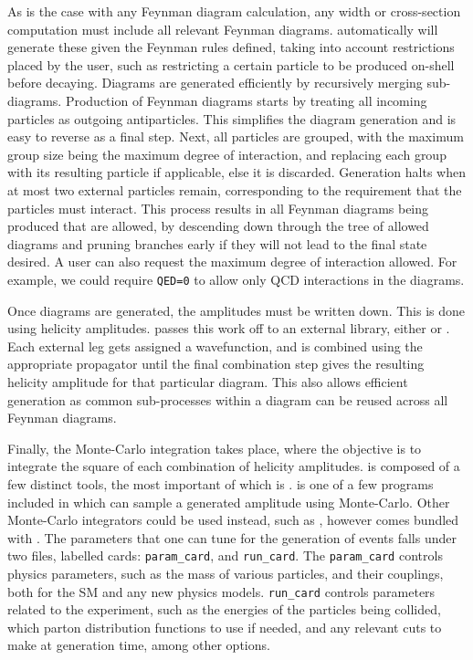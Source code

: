 As is the case with any Feynman diagram calculation, any width or cross-section computation must include all relevant Feynman diagrams.
\madgraph automatically will generate these given the Feynman rules defined, taking into account restrictions placed by the user, such as restricting a certain particle to be produced on-shell before decaying.
Diagrams are generated efficiently by recursively merging sub-diagrams.
Production of Feynman diagrams starts by treating all incoming particles as outgoing antiparticles.
This simplifies the diagram generation and is easy to reverse as a final step.
Next, all particles are grouped, with the maximum group size being the maximum degree of interaction, and replacing each group with its resulting particle if applicable, else it is discarded.
Generation halts when at most two external particles remain, corresponding to the requirement that the particles must interact.
This process results in all Feynman diagrams being produced that are allowed, by descending down through the tree of allowed diagrams and pruning branches early if they will not lead to the final state desired.
A user can also request the maximum degree of interaction allowed.
For example, we could require \texttt{QED=0} to allow only QCD interactions in the diagrams.

Once diagrams are generated, the amplitudes must be written down.
This is done using helicity amplitudes.
\madgraph passes this work off to an external library, either \helas \cite{Murayama:1992gi} or \aloha \cite{deAquino:2011ub}.
Each external leg gets assigned a wavefunction, and is combined using the appropriate propagator until the final combination step gives the resulting helicity amplitude for that particular diagram.
This also allows efficient generation as common sub-processes within a diagram can be reused across all Feynman diagrams.

Finally, the Monte-Carlo integration takes place, where the objective is to integrate the square of each combination of helicity amplitudes.
\madgraph is composed of a few distinct tools, the most important of which is \madevent.
\madevent is one of a few programs included in \madgraph which can sample a generated amplitude using Monte-Carlo.
Other Monte-Carlo integrators could be used instead, such as \pythia, however \madevent comes bundled with \madgraph.
The parameters that one can tune for the generation of events falls under two files, labelled cards: \texttt{param\_card}, and \texttt{run\_card}.
The \texttt{param\_card} controls physics parameters, such as the mass of various particles, and their couplings, both for the SM and any new physics models.
\texttt{run\_card} controls parameters related to the experiment, such as the energies of the particles being collided, which parton distribution functions to use if needed, and any relevant cuts to make at generation time, among other options.

